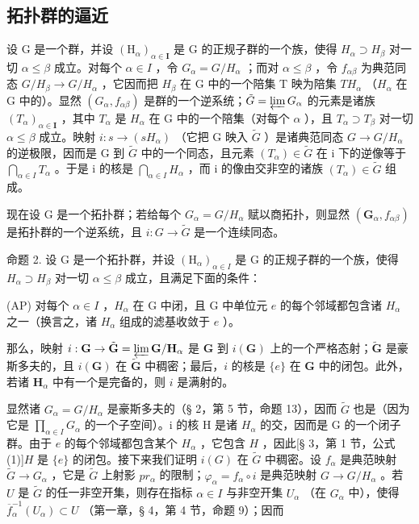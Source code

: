 \subsection{拓扑群的逼近}

设 G 是一个群，并设 \((\mathrm{H}_{\alpha})_{\alpha\in\mathbf{I}}\) 是 G 的正规子群的一个族，使得 \(H_{\alpha}\supset H_{\beta}\) 对一切 \(\alpha\leqslant\beta\) 成立。对每个 \(\alpha\in I\) ，令 \(G_{\alpha}=G/H_{\alpha}\) ；而对 \(\alpha\leqslant\beta\) ，令 \(f_{\alpha\beta}\) 为典范同态 \(G/H_{\beta}\to G/H_{\alpha}\) ，它因而把 \(H_{\beta}\) 在 G 中的一个陪集 T 映为陪集 \(TH_{\alpha}\) （\(H_{\alpha}\) 在 G 中的）。显然 \((G_{\alpha},f_{\alpha\beta})\) 是群的一个逆系统；\(\tilde{G}=\varprojlim G_{\alpha}\) 的元素是诸族 \((T_{\alpha})_{\alpha\in\mathbf{I}}\) ，其中 \(T_{\alpha}\) 是 \(H_{\alpha}\) 在 G 中的一个陪集（对每个 \(\alpha\) ），且 \(T_{\alpha}\supset T_{\beta}\) 对一切 \(\alpha\leqslant\beta\) 成立。映射 \(i:s\to(sH_{\alpha})\) （它把 G 映入 \(\tilde{G}\) ）是诸典范同态 \(G\to G/H_{\alpha}\) 的逆极限，因而是 G 到 \(\tilde{G}\) 中的一个同态，且元素 \((T_{\alpha})\in\tilde{G}\) 在 i 下的逆像等于 \(\bigcap_{\alpha\in I}T_{\alpha}\) 。于是 i 的核是 \(\bigcap_{\alpha\in I}H_{\alpha}\) ，而 i 的像由交非空的诸族 \((T_{\alpha})\in\tilde{G}\) 组成。

现在设 G 是一个拓扑群；若给每个 \(G_{\alpha} = G/H_{\alpha}\) 赋以商拓扑，则显然 \((\mathbf{G}_{\alpha}, f_{\alpha\beta})\) 是拓扑群的一个逆系统，且 \(i : G \to \tilde{G}\) 是一个连续同态。

命题 2. 设 G 是一个拓扑群，并设 \((\mathrm{H}_{\alpha})_{\alpha\in I}\) 是 G 的正规子群的一个族，使得 \(H_{\alpha}\supset H_{\beta}\) 对一切 \(\alpha\leqslant\beta\) 成立，且满足下面的条件：

(AP) 对每个 \(\alpha \in I\) ，\(H_{\alpha}\) 在 G 中闭，且 G 中单位元 \(e\) 的每个邻域都包含诸 \(H_{\alpha}\) 之一（换言之，诸 \(H_{\alpha}\) 组成的滤基收敛于 \(e\) ）。

那么，映射 \(i: \mathbf{G} \to \tilde{\mathbf{G}} = \varprojlim \mathbf{G} / \mathbf{H}_{\alpha}\) 是 \(\mathbf{G}\) 到 \(i(\mathbf{G})\) 上的一个严格态射；\(\tilde{\mathbf{G}}\) 是豪斯多夫的，且 \(i(\mathbf{G})\) 在 \(\tilde{\mathbf{G}}\) 中稠密；最后，\(i\) 的核是 \(\{e\}\) 在 \(\mathbf{G}\) 中的闭包。此外，若诸 \(\mathbf{H}_{\alpha}\) 中有一个是完备的，则 \(i\) 是满射的。

显然诸 \(G_{\alpha} = G/H_{\alpha}\) 是豪斯多夫的（§ 2，第 5 节，命题 13），因而 \(\tilde{G}\) 也是（因为它是 \(\prod_{\alpha \in I} G_{\alpha}\) 的一个子空间）。i 的核 H 是诸 \(H_{\alpha}\) 的交，因而是 G 的一个闭子群。由于 \(e\) 的每个邻域都包含某个 \(H_{\alpha}\) ，它包含 \(H\) ，因此{[}§ 3，第 1 节，公式 (1){]}\(H\) 是 \(\{e\}\) 的闭包。接下来我们证明 \(i(G)\) 在 \(\tilde{G}\) 中稠密。设 \(f_{\alpha}\) 是典范映射 \(\tilde{G} \to G_{\alpha}\) ，它是 \(\tilde{G}\) 上射影 \(pr_{\alpha}\) 的限制；\(\varphi_{\alpha} = f_{\alpha} \circ i\) 是典范映射 \(G \to G / H_{\alpha}\) 。若 \(U\) 是 \(\tilde{G}\) 的任一非空开集，则存在指标 \(\alpha \in I\) 与非空开集 \(U_{\alpha}\) （在 \(G_{\alpha}\) 中），使得 \(\overline{f}_{\alpha}^{-1}(U_{\alpha}) \subset U\) （第一章，§ 4，第 4 节，命题 9）；因而

